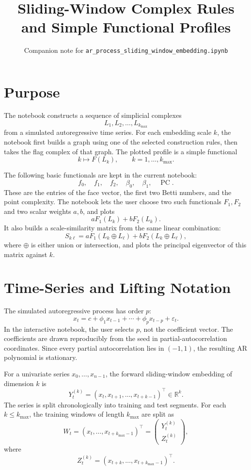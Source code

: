 \documentclass[11pt]{article}
\title{Sliding-Window Complex Rules and Simple Functional Profiles}
\author{Companion note for \texttt{ar\_process\_sliding\_window\_embedding.ipynb}}
\date{}
\newcommand{\R}{\mathbb{R}}
\begin{document}
\maketitle

\section{Purpose}

The notebook constructs a sequence of simplicial complexes
\[
  L_1,L_2,\ldots,L_{k_{\max}}
\]
from a simulated autoregressive time series. For each embedding scale \(k\),
the notebook first builds a graph using one of the selected construction rules,
then takes the flag complex of that graph. The plotted profile is a simple
functional
\[
  k \longmapsto F(L_k), \qquad k=1,\ldots,k_{\max}.
\]

The following basic functionals are kept in the current notebook:
\[
  f_0,\quad f_1,\quad f_2,\quad \beta_0,\quad \beta_1,
  \quad \operatorname{PC}.
\]
These are the entries of the face vector, the first two Betti numbers, and the
point complexity. The notebook lets the user choose two such functionals
\(F_1,F_2\) and two scalar weights \(a,b\), and plots
\[
  aF_1(L_k)+bF_2(L_k).
\]
It also builds a scale-similarity matrix from the same linear combination:
\[
  S_{k\ell}=aF_1(L_k\oplus L_\ell)+bF_2(L_k\oplus L_\ell),
\]
where \(\oplus\) is either union or intersection, and plots the principal
eigenvector of this matrix against \(k\).

\section{Time-Series and Lifting Notation}

The simulated autoregressive process has order \(p\):
\[
  x_t = c + \phi_1 x_{t-1} + \cdots + \phi_p x_{t-p} + \varepsilon_t.
\]
In the interactive notebook, the user selects \(p\), not the coefficient vector.
The coefficients are drawn reproducibly from the seed in partial-autocorrelation
coordinates. Since every partial autocorrelation lies in \((-1,1)\), the
resulting AR polynomial is stationary.

For a univariate series \(x_0,\ldots,x_{n-1}\), the forward sliding-window
embedding of dimension \(k\) is
\[
  Y_t^{(k)} =
  (x_t,x_{t+1},\ldots,x_{t+k-1})^\top \in \R^k.
\]
The series is split chronologically into training and test segments. For each
\(k \leq k_{\max}\), the training windows of length \(k_{\max}\) are split as
\[
  W_t =
  (x_t,\ldots,x_{t+k_{\max}-1})^\top
  =
  \begin{pmatrix}
    Y_t^{(k)}\\
    Z_t^{(k)}
  \end{pmatrix},
\]
where
\[
  Z_t^{(k)} = (x_{t+k},\ldots,x_{t+k_{\max}-1})^\top.
\]
\end{document}
